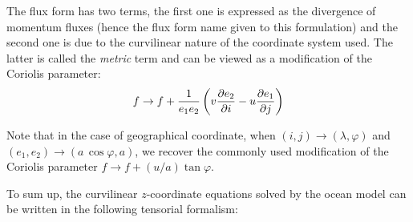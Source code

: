 \documentclass[../main/NEMO_manual]{subfiles}
\begin{document}
The flux form has two terms,
the first one is expressed as the divergence of momentum fluxes (hence the flux form name given to this formulation)
and the second one is due to the curvilinear nature of the coordinate system used.
The latter is called the \textit{metric} term and can be viewed as a modification of the Coriolis parameter: 
\[
  f \to f + \frac{1}{e_1 e_2} \lt( v \pd[e_2]{i} - u \pd[e_1]{j} \rt)
\]

Note that in the case of geographical coordinate,
\ie when $(i,j) \to (\lambda,\varphi)$ and $(e_1,e_2) \to (a \, \cos \varphi,a)$,
we recover the commonly used modification of the Coriolis parameter $f \to f + (u / a) \tan \varphi$.

To sum up, the curvilinear $z$-coordinate equations solved by the ocean model can be written in
the following tensorial formalism:
\end{document}
